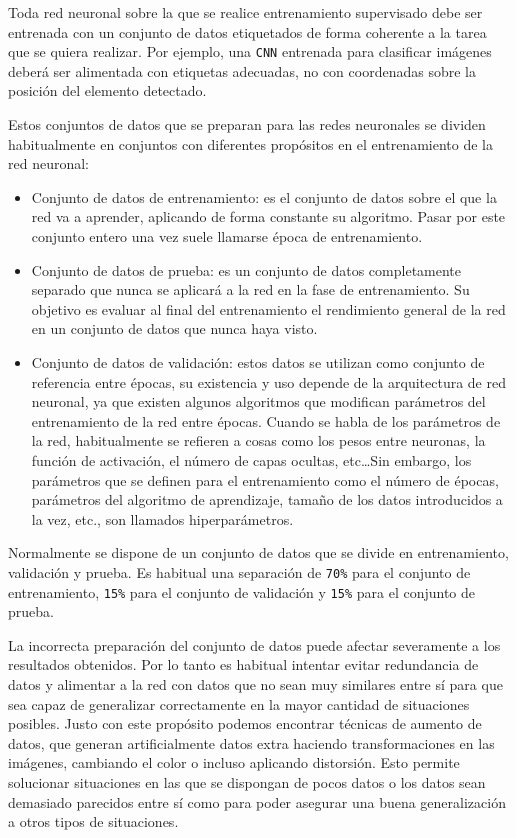 Toda red neuronal sobre la que se realice entrenamiento supervisado debe ser entrenada con un conjunto de datos etiquetados de forma coherente a la tarea que se quiera realizar. Por ejemplo, una \texttt{CNN} 
entrenada para clasificar imágenes deberá ser alimentada con etiquetas adecuadas, no con coordenadas sobre la posición del elemento detectado.

Estos conjuntos de datos que se preparan para las redes neuronales se dividen habitualmente en conjuntos con diferentes propósitos en el entrenamiento de la red neuronal:

\begin{itemize}
    \item Conjunto de datos de entrenamiento: es el conjunto de datos sobre el que la red va a aprender, aplicando de forma constante su algoritmo. Pasar por este conjunto entero una vez suele llamarse época 
    de entrenamiento.
    \item Conjunto de datos de prueba: es un conjunto de datos completamente separado que nunca se aplicará a la red en la fase de entrenamiento. Su objetivo es evaluar al final del entrenamiento el 
    rendimiento general de la red en un conjunto de datos que nunca haya visto.
    \item Conjunto de datos de validación: estos datos se utilizan como conjunto de referencia entre épocas, su existencia y uso depende de la arquitectura de red neuronal, ya que existen 
    algunos algoritmos que modifican parámetros del entrenamiento de la red entre épocas.\newline
    Cuando se habla de los parámetros de la red, habitualmente se refieren a cosas como los pesos entre neuronas, la función de activación, el número de capas ocultas, etc\dots Sin embargo, los parámetros 
    que se definen para el entrenamiento como el número de épocas, parámetros del algoritmo de aprendizaje, tamaño de los datos introducidos a la vez, etc., son llamados hiperparámetros.
\end{itemize}

Normalmente se dispone de un conjunto de datos que se divide en entrenamiento, validación y prueba. Es habitual una separación de \texttt{70\%} para el conjunto de entrenamiento, \texttt{15\%} para el conjunto de 
validación y \texttt{15\%} para el conjunto de prueba.

La incorrecta preparación del conjunto de datos puede afectar severamente a los resultados obtenidos. Por lo tanto es habitual intentar evitar redundancia de datos y alimentar a la red con datos que no sean muy 
similares entre sí para que sea capaz de generalizar correctamente en la mayor cantidad de situaciones posibles.\newline
Justo con este propósito podemos encontrar técnicas de aumento de datos, que generan artificialmente datos extra haciendo transformaciones en las imágenes, cambiando el color o incluso aplicando distorsión. 
Esto permite solucionar situaciones en las que se dispongan de pocos datos o los datos sean demasiado parecidos entre sí como para poder asegurar una buena generalización a otros tipos de situaciones.


